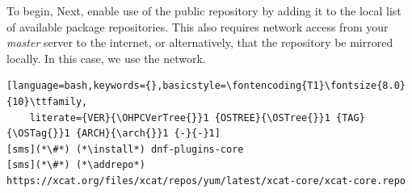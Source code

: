 To begin,
\else
Next,
\fi
enable use of the public \xCAT{} repository by adding it to the local list
of available package repositories. This also requires network access from
your {\em master} server to the internet, or alternatively, that
the repository be mirrored locally. In this case, we use the network.

\begin{lstlisting}[language=bash,keywords={},basicstyle=\fontencoding{T1}\fontsize{8.0}{10}\ttfamily,
	literate={VER}{\OHPCVerTree{}}1 {OSTREE}{\OSTree{}}1 {TAG}{\OSTag{}}1 {ARCH}{\arch{}}1 {-}{-}1]
[sms](*\#*) (*\install*) dnf-plugins-core
[sms](*\#*) (*\addrepo*) https://xcat.org/files/xcat/repos/yum/latest/xcat-core/xcat-core.repo
\end{lstlisting}

